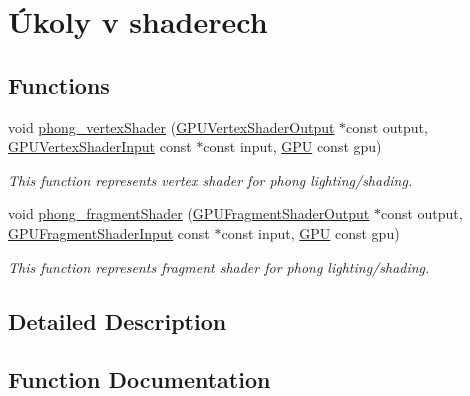 \hypertarget{group__shader__side}{}\section{Úkoly v shaderech}
\label{group__shader__side}
\subsection*{Functions}
\begin{DoxyCompactItemize}
\item 
void \hyperlink{group__shader__side_gabf238d989258c2c2e8e807e42e1c1404}{phong\+\_\+vertex\+Shader} (\hyperlink{structGPUVertexShaderOutput}{G\+P\+U\+Vertex\+Shader\+Output} $\ast$const output, \hyperlink{structGPUVertexShaderInput}{G\+P\+U\+Vertex\+Shader\+Input} const $\ast$const input, \hyperlink{fwd_8h_a06964ec111fe28721d8618b6d0d993bf}{G\+PU} const gpu)
\begin{DoxyCompactList}\small\item\em This function represents vertex shader for phong lighting/shading. \end{DoxyCompactList}\item 
void \hyperlink{group__shader__side_ga9cb61ad448e54a23ba4d01a6ebdb48eb}{phong\+\_\+fragment\+Shader} (\hyperlink{structGPUFragmentShaderOutput}{G\+P\+U\+Fragment\+Shader\+Output} $\ast$const output, \hyperlink{structGPUFragmentShaderInput}{G\+P\+U\+Fragment\+Shader\+Input} const $\ast$const input, \hyperlink{fwd_8h_a06964ec111fe28721d8618b6d0d993bf}{G\+PU} const gpu)
\begin{DoxyCompactList}\small\item\em This function represents fragment shader for phong lighting/shading. \end{DoxyCompactList}\end{DoxyCompactItemize}


\subsection{Detailed Description}


\subsection{Function Documentation}
